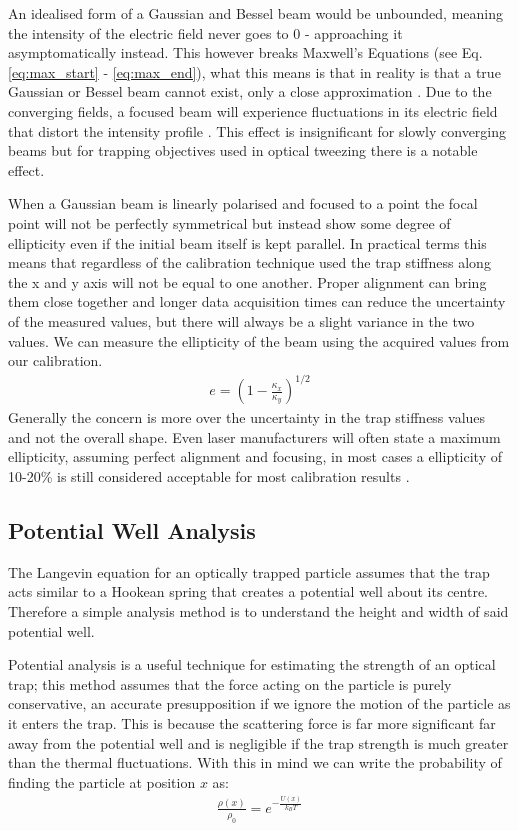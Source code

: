 An idealised form of a Gaussian and Bessel beam would be 
unbounded, meaning the intensity of the electric field 
never goes to 0 - approaching it asymptomatically instead. 
This however breaks Maxwell's Equations (see Eq.
\eqref{eq:max_start} - \eqref{eq:max_end}), what this 
means is that in reality is that a true Gaussian or Bessel 
beam cannot exist, only a close approximation \cite{Gouesbet1988}. 
Due to the converging fields, a focused beam will experience 
fluctuations in its electric field that distort the intensity 
profile \cite{Lock1994}. This effect is insignificant 
for slowly converging beams but for trapping objectives 
used in optical tweezing there is a notable effect. 

When a Gaussian beam is linearly polarised and 
focused to a point the focal point will not be 
perfectly symmetrical but instead show some 
degree of ellipticity even if the initial beam 
itself is kept parallel. In practical terms this
means that regardless of the calibration 
technique used the trap stiffness along the x and
y axis will not be equal to one another. Proper
alignment can bring them close together and longer
data acquisition times can reduce the uncertainty of
the measured values, but there will always be a 
slight variance in the two values. We can measure
the ellipticity of the beam using the acquired values 
from our calibration.
\begin{align}
	e = \left(1-\frac{\kappa_x}{\kappa_y}\right)^{1/2}
\end{align}
Generally the concern is more over the uncertainty in 
the trap stiffness values and not the overall shape. 
Even laser manufacturers will often state a maximum
ellipticity, assuming perfect alignment and focusing, 
in most cases a ellipticity of 10-20\%  is still 
considered acceptable for most calibration results
\cite{BergSoerensen2004}.

\subsection{Potential Well Analysis}
The Langevin equation for an optically trapped particle assumes 
that the trap acts similar to a Hookean spring that creates a 
potential well about its centre. Therefore a simple analysis 
method is to understand the height and width of said potential well. 

Potential analysis is a useful technique for estimating the 
strength of an optical trap; this method assumes that the force 
acting on the particle is purely conservative, an accurate 
presupposition if we ignore the motion of the particle as it 
enters the trap. This is because the scattering force is far 
more significant far away from the potential well and is 
negligible if the trap strength is much greater than the thermal 
fluctuations. With this in mind we can write the probability of 
finding the particle at position $x$ as:
\begin{align}
	\frac{\rho(x)}{\rho_0} = e^{-\frac{U(x)}{k_{B}T}} 
\end{align}

